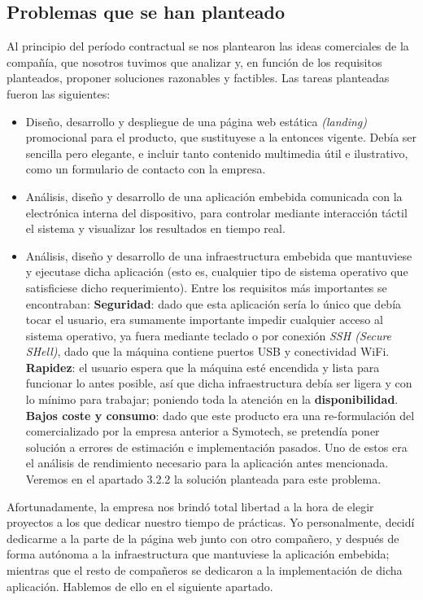 \documentclass[13pt]{scrartcl}
\begin{document}
		\subsection{Problemas que se han planteado}
			Al principio del período contractual se nos plantearon las ideas comerciales de la compañía, que nosotros tuvimos que analizar y, en función de los requisitos planteados, proponer soluciones razonables y factibles. Las tareas planteadas fueron las siguientes:
			\begin{itemize}
				\item Diseño, desarrollo y despliegue de una página web estática \textit{(landing)} promocional para el producto, que sustituyese a la entonces vigente. Debía ser sencilla pero elegante, e incluir tanto contenido multimedia útil e ilustrativo, como un formulario de contacto con la empresa.
				\item Análisis, diseño y desarrollo de una aplicación embebida comunicada con la electrónica interna del dispositivo, para controlar mediante interacción táctil el sistema y visualizar los resultados en tiempo real.
				\item Análisis, diseño y desarrollo de una infraestructura embebida que mantuviese y ejecutase dicha aplicación (esto es, cualquier tipo de sistema operativo que satisficiese dicho requerimiento). Entre los requisitos más importantes se encontraban:
					\subitem \textbf{Seguridad}: dado que esta aplicación sería lo único que debía tocar el usuario, era sumamente importante impedir cualquier acceso al sistema operativo, ya fuera mediante teclado o por conexión \textit{SSH (Secure SHell)}, dado que la máquina contiene puertos USB y conectividad WiFi.
					\subitem \textbf{Rapidez}: el usuario espera que la máquina esté encendida y lista para funcionar lo antes posible, así que dicha infraestructura debía ser ligera y con lo mínimo para trabajar; poniendo toda la atención en la \textbf{disponibilidad}.
					\subitem \textbf{Bajos coste y consumo}: dado que este producto era una re-formulación del comercializado por la empresa anterior a Symotech, se pretendía poner solución a errores de estimación e implementación pasados. Uno de estos era el análisis de rendimiento necesario para la aplicación antes mencionada. Veremos en el apartado 3.2.2 la solución planteada para este problema.
			\end{itemize}
			Afortunadamente, la empresa nos brindó total libertad a la hora de elegir proyectos a los que dedicar nuestro tiempo de prácticas. Yo personalmente, decidí dedicarme a la parte de la página web junto con otro compañero, y después de forma autónoma a la infraestructura que mantuviese la aplicación embebida; mientras que el resto de compañeros se dedicaron a la implementación de dicha aplicación. Hablemos de ello en el siguiente apartado.
		
\end{document}
